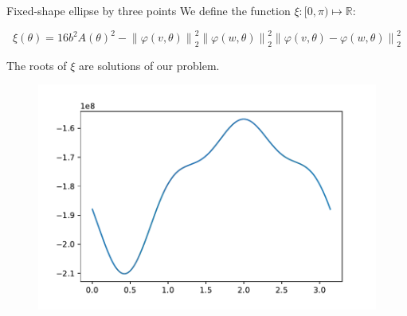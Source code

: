 \documentclass{beamer}
\newcommand{\R}{\mathbb{R}}
\newcommand{\norm}[2][2]{\left\lVert#2\right\rVert_{#1}}
\begin{document}
\begin{frame}{Fixed-shape ellipse by three points}
We define the function $\xi : [0, \pi) \mapsto \R$:

	\begin{equation*}
	\xi(\theta) = 16b^2A(\theta)^2 - \norm{\varphi(v, \theta)}^2\norm{\varphi(w, \theta)}^2\norm{\varphi(v, \theta)-\varphi(w, \theta)}^2
	\end{equation*}
	
The roots of $\xi$ are solutions of our problem.
	\begin{figure}
	\centering

	\includegraphics[scale=.5]{036}
	
\end{figure}
\end{frame}
	
\end{document}
